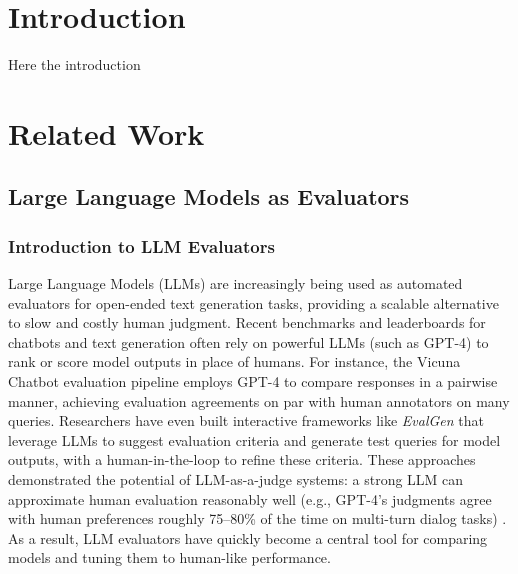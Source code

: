 \documentclass[sigconf, authoryear]{acmart}
\begin{document}

\maketitle


\section{Introduction}
Here the introduction


\section{Related Work}\label{sec:related-work}

\subsection{Large Language Models as Evaluators}\label{subsec:large-language-models-as-evaluators}

\subsubsection{Introduction to LLM Evaluators}

Large Language Models (LLMs) are increasingly being used as automated evaluators for open-ended text generation tasks, providing a scalable alternative to slow and costly human judgment.
Recent benchmarks and leaderboards for chatbots and text generation often rely on powerful LLMs (such as GPT-4) to rank or score model outputs in place of humans.
For instance, the Vicuna Chatbot evaluation pipeline employs GPT-4 to compare responses in a pairwise manner, achieving evaluation agreements on par with human annotators on many queries.
Researchers have even built interactive frameworks like \textit{EvalGen} \cite{evalgen} that leverage LLMs to suggest evaluation criteria and generate test queries for model outputs, with a human-in-the-loop to refine these criteria.
These approaches demonstrated the potential of LLM-as-a-judge systems: a strong LLM can approximate human evaluation reasonably well (e.g., GPT-4’s judgments agree with human preferences roughly 75–80\% of the time on multi-turn dialog tasks) \cite{mtbench}.
As a result, LLM evaluators have quickly become a central tool for comparing models and tuning them to human-like performance.
\end{document}

